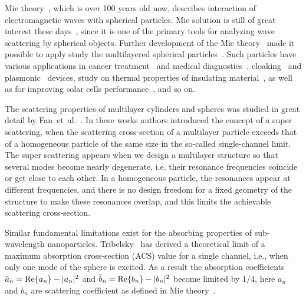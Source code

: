\documentclass[aps,prl,twocolumn,showpacs,superscriptaddress,groupedaddress]{revtex4-1}
\begin{document}
\maketitle %

Mie theory~\cite{Mie-1908}, which is over 100 years old now, describes
interaction of electromagnetic waves with spherical particles. Mie
solution is still of great interest these
days~\cite{Suzuki-2008,MacKowski-2012,Lerme-2000,Xu-2005,Li-2006,Gogoi-2010,Santiago-2011},
since it is one of the primary tools for analyzing wave scattering by
spherical objects. Further development of the Mie
theory~\cite{Yang-2003, Pena-scattnlay-2009} made it possible to apply
study the multilayered spherical
particles~\cite{Sheehan-2013,Selmke-2012}.  Such particles have
various applications in cancer treatment~\cite{Zhang-2010,
  Hirsch-2003} and medical diagnostics~\cite{Allain-2002},
cloaking~\cite{Qui-2009, Semouchkina-2013, Ladutenko-2014} and
plasmonic~\cite{Martin-2013, Alu-2005} devices, study on thermal
properties of insulating material~\cite{Xie-2013}, as well as for
improving solar cells performance~\cite{Kameya-2011,Mann-2011}, and so
on.

The scattering properties of multilayer cylinders and spheres was
studied in great detail by Fan~et~al.~\cite{Fan-2010,Fan-2011}.  In these
works authors introduced the concept of a super scattering, when the
scattering cross-section of a multilayer particle exceeds that of a
homogeneous particle of the same size in the so-called single-channel
limit. The super scattering appears when we design a multilayer
structure so that several modes become nearly degenerate, i.e. their
resonance frequencies coincide or get close to each other. In a
homogeneous particle, the resonances appear at different frequencies,
and there is no design freedom for a fixed geometry of the structure
to make these resonances overlap, and this limits the achievable
scattering cross-section.

Similar fundamental limitations exist for the absorbing properties of
sub-wavelength nanoparticles.  Tribelsky~\cite{Tribelsky-2011} has derived a
theoretical limit of a maximum absorption cross-section (ACS) value
for a single channel, i.e., when only one mode of the sphere is
excited.  As a result the absorption coefficients $\tilde{a}_n= {\rm
  Re}\{a_n\} - |a_n|^2 $ and $\tilde{b}_n= {\rm Re}\{b_n\} - |b_n|^2 $
become limited by $1/4$, here $a_n$ and $b_n$ are scattering
coefficient as defined in Mie theory~\cite{Bohren-1983}.
\end{document}
